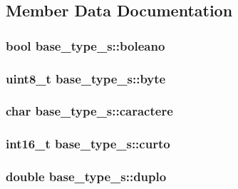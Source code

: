 \subsection{Member Data Documentation}
\hypertarget{unionbase__type__s_a67bd49b04a984ad96792e5b22c8a1cf3}{
\subsubsection[{boleano}]{\setlength{\rightskip}{0pt plus 5cm}bool base\+\_\+type\+\_\+s\+::boleano}}\label{unionbase__type__s_a67bd49b04a984ad96792e5b22c8a1cf3}
\hypertarget{unionbase__type__s_a0764f45a4f066274e13342daba99a1a9}{
\subsubsection[{byte}]{\setlength{\rightskip}{0pt plus 5cm}uint8\+\_\+t base\+\_\+type\+\_\+s\+::byte}}\label{unionbase__type__s_a0764f45a4f066274e13342daba99a1a9}
\hypertarget{unionbase__type__s_ae87ff5b2ecc7de22ab4012a8c4ee71b7}{
\subsubsection[{caractere}]{\setlength{\rightskip}{0pt plus 5cm}char base\+\_\+type\+\_\+s\+::caractere}}\label{unionbase__type__s_ae87ff5b2ecc7de22ab4012a8c4ee71b7}
\hypertarget{unionbase__type__s_a210f8a1effde127c16d34dd8d45f64e6}{
\subsubsection[{curto}]{\setlength{\rightskip}{0pt plus 5cm}int16\+\_\+t base\+\_\+type\+\_\+s\+::curto}}\label{unionbase__type__s_a210f8a1effde127c16d34dd8d45f64e6}
\hypertarget{unionbase__type__s_ab790d7e640db0b9f99c8f1b202cbc1cb}{
\subsubsection[{duplo}]{\setlength{\rightskip}{0pt plus 5cm}double base\+\_\+type\+\_\+s\+::duplo}}\label{unionbase__type__s_ab790d7e640db0b9f99c8f1b202cbc1cb}

